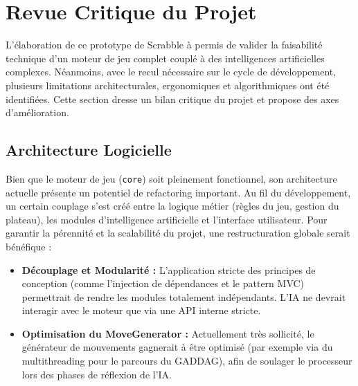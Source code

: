 \documentclass[a4paper]{article}
\begin{document}

	
    \section{Revue Critique du Projet}
	
	L'élaboration de ce prototype de Scrabble à permis de valider la faisabilité technique d'un moteur de jeu complet couplé à des intelligences artificielles complexes. Néanmoins, avec le recul nécessaire sur le cycle de développement, plusieurs limitations architecturales, ergonomiques et algorithmiques ont été identifiées. Cette section dresse un bilan critique du projet et propose des axes d'amélioration.
	
	\subsection{Architecture Logicielle}
	Bien que le moteur de jeu (\texttt{core}) soit pleinement fonctionnel, son architecture actuelle présente un potentiel de refactoring important. Au fil du développement, un certain couplage s'est créé entre la logique métier (règles du jeu, gestion du plateau), les modules d'intelligence artificielle et l'interface utilisateur.
	Pour garantir la pérennité et la scalabilité du projet, une restructuration globale serait bénéfique :
	\begin{itemize}
		\item \textbf{Découplage et Modularité :} L'application stricte des principes de conception (comme l'injection de dépendances et le pattern MVC) permettrait de rendre les modules totalement indépendants. L'IA ne devrait interagir avec le moteur que via une API interne stricte.
		\item \textbf{Optimisation du MoveGenerator :} Actuellement très sollicité, le générateur de mouvements gagnerait à être optimisé (par exemple via du multithreading pour le parcours du GADDAG), afin de soulager le processeur lors des phases de réflexion de l'IA.
	\end{itemize}
	
\end{document}
